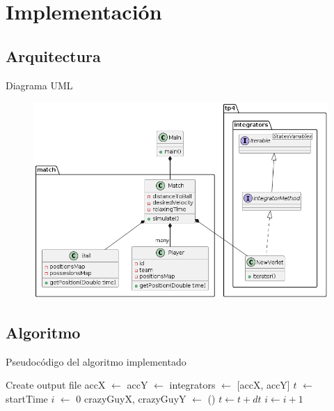 \documentclass{beamer}
\begin{document}
    \section{Implementación}

        \subsection{Arquitectura}

            \begin{frame}{Diagrama UML}
                \begin{figure}[htbp]
                    \centering
                    \includegraphics[width=\textwidth]{./architecture}
                    \label{fig:architecture}
                \end{figure}
            \end{frame}

        \subsection{Algoritmo}

            \begin{frame}{Pseudocódigo del algoritmo implementado}{}
                \begin{algorithmic}[1]
                    \ttfamily \scriptsize
                    \State Create output file
                    \State accX $\gets$ 
                    \State accY $\gets$ 
                    \State integrators $\gets$ [accX, accY]
                    \State $t$ $\gets$ startTime
                    \State $i$ $\gets$ 0
                        \State crazyGuyX, crazyGuyY $\gets$ ()
                        \State {}
                            \State {}
                        \EndIf
                        \State $t \gets t + dt$
                        \State $i \gets i + 1$
                    \EndWhile
                \end{algorithmic}
            \end{frame}
\end{document}
